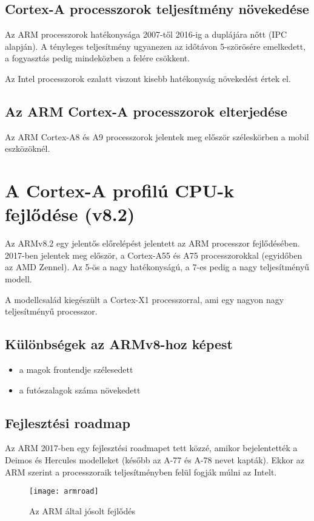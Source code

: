 \subsection{Cortex-A processzorok teljesítmény növekedése}
Az ARM processzorok hatékonysága 2007-től 2016-ig a duplájára nőtt (IPC alapján).
A tényleges teljesítmény ugyanezen az időtávon 5-szörösére emelkedett, a fogyasztás pedig mindeközben a felére csökkent.

Az Intel processzorok ezalatt viszont kisebb hatékonyság növekedést értek el.

\subsection{Az ARM Cortex-A processzorok elterjedése}
Az ARM Cortex-A8 és A9 processzorok jelentek meg először széleskörben a mobil eszközöknél.

\section{A Cortex-A profilú CPU-k fejlődése (v8.2)}
Az ARMv8.2 egy jelentős előrelépést jelentett az ARM processzor fejlődésében.
2017-ben jelentek meg először, a Cortex-A55 és A75 processzorokkal (egyidőben az AMD Zennel).
Az 5-ös a nagy hatékonyságú, a 7-es pedig a nagy teljesítményű modell.

A modellcsalád kiegészült a Cortex-X1 processzorral, ami egy nagyon nagy teljesítményű processzor.

\subsection{Különbségek az ARMv8-hoz képest}
\begin{itemize}
    \item a magok frontendje szélesedett
    \item a futószalagok száma növekedett
\end{itemize}

\subsection{Fejlesztési roadmap}
Az ARM 2017-ben egy fejlesztési roadmapet tett közzé, amikor bejelentették a Deimos és Hercules modelleket (később az A-77 és A-78 nevet kapták).
Ekkor az ARM szerint a processzoraik teljesítményben felül fogják múlni az Intelt.
\begin{figure}[H]
    \texttt{[image: armroad]}
    \centering
    \caption{Az ARM által jósolt fejlődés}
    \label{fig:armroad}
\end{figure}

